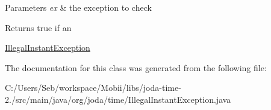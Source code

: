 \begin{DoxyParams}{Parameters}
{\em ex} & the exception to check \\
\hline
\end{DoxyParams}
\begin{DoxyReturn}{Returns}
true if an
\begin{DoxyCode}
\hyperlink{classorg_1_1joda_1_1time_1_1_illegal_instant_exception_a5587ab31d9a4e615779b28fd4234978c}{IllegalInstantException} 
\end{DoxyCode}
 
\end{DoxyReturn}


The documentation for this class was generated from the following file\-:\begin{DoxyCompactItemize}
\item 
C\-:/\-Users/\-Seb/workspace/\-Mobii/libs/joda-\/time-\/2./src/main/java/org/joda/time/Illegal\-Instant\-Exception.\-java\end{DoxyCompactItemize}
